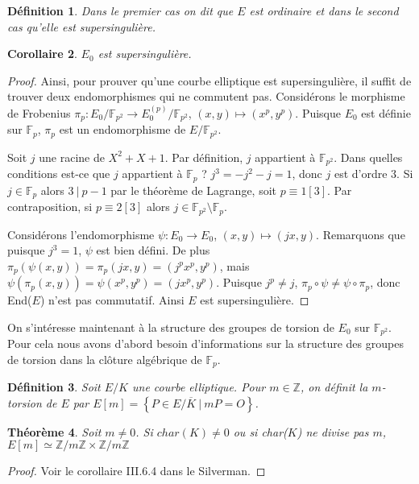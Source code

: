\documentclass{article}
\theoremstyle{plain}%
\newtheorem{thm}{Théorème}[section]
\newtheorem{deff}[thm]{Définition}
\newtheorem{cor}[thm]{Corollaire}
\theoremstyle{definition}%
\newcommand{\F}{\mathbb{F}}
\newcommand{\Z}{\mathbb{Z}}
\begin{document}
\begin{deff}
  Dans le premier cas on dit que $E$ est \textit{ordinaire} et dans le second cas qu'elle est \textit{supersingulière}.
\end{deff}

\begin{cor}
  $E_0$ est supersingulière.
\end{cor}

\begin{proof}
Ainsi, pour prouver qu'une courbe elliptique est supersingulière, il suffit de trouver deux endomorphismes qui ne commutent pas.
Considérons le morphisme de Frobenius $\pi_p : E_0/\F_{p^2} \to E_0^{(p)}/\F_{p^2}$, $(x, y) \mapsto (x^p, y^p)$. 
Puisque $E_0$ est définie sur $\F_{p}$, $\pi_p$ est un endomorphisme de $E/\F_{p^2}$.

Soit $j$ une racine de $X^2 + X + 1$. 
Par définition, $j$ appartient à $\F_{p^2}$. 
Dans quelles conditions est-ce que $j$ appartient à $\F_{p}$ ? 
$j^3 = -j^2 -j = 1$, donc $j$ est d'ordre $3$. 
Si $j\in \F_{p}$ alors $3\ |\ p-1$ par le théorème de Lagrange, soit $p\equiv 1[3]$. 
Par contraposition, si $p \equiv 2 [3]$ alors $j\in\F_{p^2}\setminus\F_{p}$.

Considérons l'endomorphisme $\psi : E_0 \to E_0$, $(x, y) \mapsto (jx, y)$. 
Remarquons que puisque $j^3 = 1$, $\psi$ est bien défini.
De plus $\pi_p(\psi(x, y)) = \pi_p(jx, y) = (j^px^p, y^p)$, mais $\psi(\pi_p(x, y)) = \psi(x^p, y^p) = (jx^p, y^p)$. 
Puisque $j^p\neq j$, $\pi_p \circ \psi \neq \psi \circ \pi_p$, donc End($E$) n'est pas commutatif.
Ainsi $E$ est supersingulière.
\end{proof}

On s'intéresse maintenant à la structure des groupes de torsion de $E_0$ sur $\F_{p^2}$. Pour cela nous avons d'abord besoin d'informations sur la structure des groupes de torsion dans la clôture algébrique de $\F_{p}$.
\begin{deff}
  Soit $E/K$ une courbe elliptique. Pour $m\in\Z$, on définit la $m$-torsion de $E$ par $ E[m] = \left\{ P\in E/\overline{K} \ \vert\  mP = O \right\}$.
\end{deff}

\begin{thm}
  Soit $m\neq0$. Si $char(K)\neq 0$ ou si char($K$) ne divise pas $m$, $E[m] \simeq {\Z}/{m\Z} \times  {\Z}/{m\Z}$
\end{thm}

\begin{proof}
  Voir le corollaire III.6.4 dans le Silverman.
\end{proof}
\end{document}

